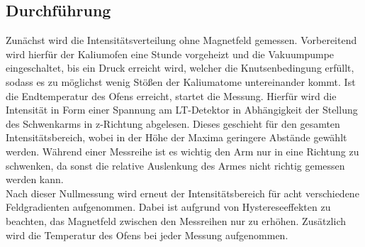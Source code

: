 \subsection{Durchführung}
\label{sec:durchführung}
Zunächst wird die Intensitätsverteilung ohne Magnetfeld gemessen.
Vorbereitend wird hierfür der Kaliumofen eine Stunde vorgeheizt und die Vakuumpumpe eingeschaltet, bis ein Druck erreicht wird, welcher die Knutsenbedingung erfüllt, sodass es zu möglichst wenig Stößen der Kaliumatome untereinander kommt.
Ist die Endtemperatur des Ofens erreicht, startet die Messung.
Hierfür wird die Intensität in Form einer Spannung am LT-Detektor in Abhängigkeit der Stellung des Schwenkarms in z-Richtung abgelesen.
Dieses geschieht für den gesamten Intensitätsbereich, wobei in der Höhe der Maxima geringere Abstände gewählt werden.
Während einer Messreihe ist es wichtig den Arm nur in eine Richtung zu schwenken, da sonst die relative Auslenkung des Armes nicht richtig gemessen werden kann.\\
Nach dieser Nullmessung wird erneut der Intensitätsbereich für acht verschiedene Feldgradienten aufgenommen.
Dabei ist aufgrund von Hystereseeffekten zu beachten, das Magnetfeld zwischen den Messreihen nur zu erhöhen.
Zusätzlich wird die Temperatur des Ofens bei jeder Messung aufgenommen.
